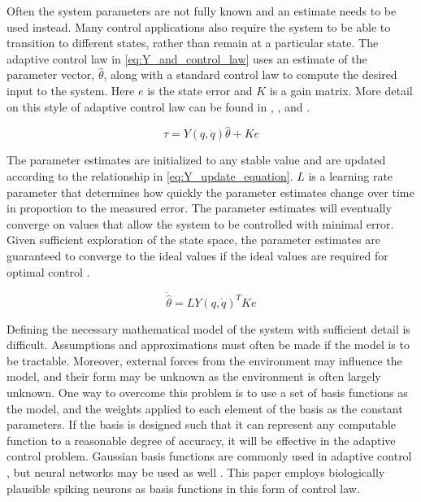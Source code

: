 \documentclass[letterpaper, 10 pt, conference]{ieeeconf}  %
\begin{document}
Often the system parameters are not fully known and an estimate needs to be used instead.
Many control applications also require the system to be able to transition to different states, rather than remain at a particular state.
The adaptive control law in \eqref{eq:Y_and_control_law} uses an estimate of the parameter vector, $\hat{\theta}$, along with a standard control law to compute the desired input to the system. Here $e$ is the state error and $K$ is a gain matrix.
More detail on this style of adaptive control law can be found in \cite{slotine1987adaptive}, \cite{slotine1991applied}, and \cite{cheah2006adaptive}.

\begin{equation} \label{eq:Y_and_control_law}
\tau = Y(q,\dot{q})\hat{\theta} + Ke
\end{equation}

The parameter estimates are initialized to any stable value and are updated according to the relationship in \eqref{eq:Y_update_equation}.
$L$ is a learning rate parameter that determines how quickly the parameter estimates change over time in proportion to the measured error.
The parameter estimates will eventually converge on values that allow the system to be controlled with minimal error.
Given sufficient exploration of the state space, the parameter estimates are guaranteed to converge to the ideal values if the ideal values are required for optimal control \cite{slotine1987adaptive}.

\begin{equation} \label{eq:Y_update_equation}
\dot{\hat{\theta}} = LY(q,\dot{q})^{T}Ke
\end{equation}

Defining the necessary mathematical model of the system with sufficient detail is difficult. 
Assumptions and approximations must often be made if the model is to be tractable. 
Moreover, external forces from the environment may influence the model, and their form may be unknown as the environment is often largely unknown. 
One way to overcome this problem is to use a set of basis functions as the model, and the weights applied to each element of the basis as the constant parameters. 
If the basis is designed such that it can represent any computable function to a reasonable degree of accuracy, it will be effective in the adaptive control problem. 
Gaussian basis functions are commonly used in adaptive control \cite{sanner1992gaussian}, but neural networks may be used as well \cite{barto1983neuronlike}.
This paper employs biologically plausible spiking neurons as basis functions in this form of control law.
\end{document}
